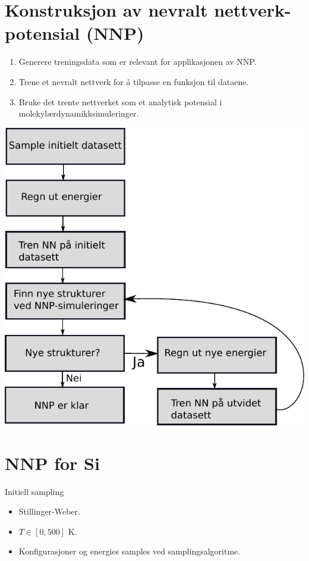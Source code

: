 \documentclass{beamer}
\begin{document}
\section{Konstruksjon av nevralt nettverk-potensial (NNP)}


\begin{frame}

\begin{enumerate}
 \item Generere treningsdata som er relevant for applikasjonen av NNP. 
 \item Trene et nevralt nettverk for å tilpasse en funksjon til dataene. 
 \item Bruke det trente nettverket som et analytisk potensial i molekylærdynamikksimuleringer. 
\end{enumerate}

\end{frame}


\begin{frame}
 
\centering
\includegraphics[width=0.7\linewidth]{../Figures/Presentation/iterativeSampling.pdf} 

\end{frame}


\section{NNP for Si}


\begin{frame}

\begin{block}{Initiell sampling}
 \begin{itemize}
  \item Stillinger-Weber. 
  \item $T \in [0,500]$ K. 
  \item Konfigurasjoner og energies samples ved samplingsalgoritme.  
 \end{itemize}
\end{block}

\end{frame}
\end{document}
